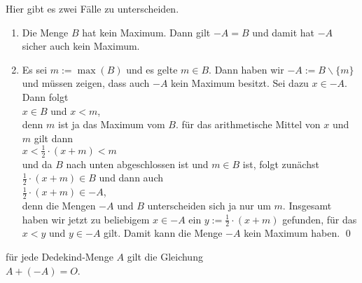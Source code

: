 \begin{enumerate}
      Hier gibt es zwei F\"alle zu unterscheiden.
      \begin{enumerate}
      \item Die Menge $B$ hat kein Maximum.  Dann gilt $-A = B$ und damit hat $-A$ sicher auch kein
            Maximum. 
      \item Es sei $m := \max(B)$ und es gelte $m \in B$.  Dann haben wir $-A := B \backslash \{ m \}$
            und m\"ussen zeigen, dass auch $-A$ kein Maximum besitzt.   Sei dazu $x \in -A$.
            Dann folgt 
            \\[0.2cm]
            \hspace*{1.3cm}
            $x \in B$ \quad und \quad $x < m$, 
            \\[0.2cm]
            denn $m$ ist ja das Maximum vom $B$.  f\"ur das arithmetische Mittel von $x$ und $m$ gilt
            dann
            \\[0.2cm]
            \hspace*{1.3cm}
            $x < \frac{1}{2} \cdot (x + m) < m$
            \\[0.2cm]
            und da $B$ nach unten abgeschlossen ist und $m \in B$ ist, folgt zun\"achst $\frac{1}{2} \cdot (x + m) \in
            B$ und dann auch
            \\[0.2cm]
            \hspace*{1.3cm}
            $\frac{1}{2} \cdot (x + m) \in -A$,
            \\[0.2cm]  
            denn die Mengen $-A$ und $B$ unterscheiden sich ja nur um $m$.  Insgesamt haben wir
            jetzt zu beliebigem $x \in -A$ ein $y := \frac{1}{2} \cdot (x + m)$ gefunden, f\"ur das 
            $x < y$ und $y \in -A$ gilt.  Damit kann die Menge $-A$ kein Maximum haben. \qed
      \end{enumerate}

\end{enumerate}

\begin{Satz}
  f\"ur jede Dedekind-Menge $A$ gilt die Gleichung
  \\[0.2cm]
  \hspace*{1.3cm}
  $A + (-A) = O$. \eox
\end{Satz}

